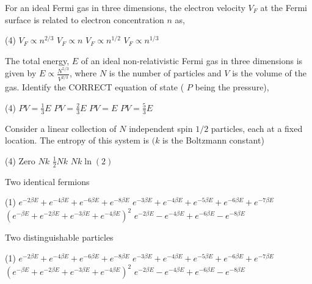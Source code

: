 \begin{enumerate}
\item For an ideal Fermi gas in three dimensions, the electron velocity $V_{F}$ at the Fermi surface is related to electron concentration $n$ as,
{}

\begin{tasks}(4)
	\task[\textbf{A.}] $V_{F} \propto n^{2 / 3}$
	\task[\textbf{B.}]  $V_{F} \propto n$
	\task[\textbf{C.}] $V_{F} \propto n^{1 / 2}$
	\task[\textbf{D.}] $V_{F} \propto n^{1 / 3}$
\end{tasks}

\item The total energy, $E$ of an ideal non-relativistic Fermi gas in three dimensions is given by $E \propto \frac{N^{5 / 3}}{V^{2 / 3}}$, where $N$ is the number of particles and $V$ is the volume of the gas. Identify the CORRECT equation of state ( $P$ being the pressure),
{}
\begin{tasks}(4)
	\task[\textbf{A.}] $P V=\frac{1}{3} E$
	\task[\textbf{B.}] $P V=\frac{2}{3} E$
	\task[\textbf{C.}] $P V=E$
	\task[\textbf{D.}] $P V=\frac{5}{3} E$
\end{tasks}

\item Consider a linear collection of $N$ independent spin $1 / 2$ particles, each at a fixed location. The entropy of this system is $(k$ is the Boltzmann constant)
{}
\begin{tasks}(4)
	\task[\textbf{A.}] Zero
	\task[\textbf{B.}]  $N k$
	\task[\textbf{C.}]  $\frac{1}{2} N k$
	\task[\textbf{D.}] $N k \ln (2)$
\end{tasks}

\item Two identical fermions
{}
\begin{tasks}(1)
	\task[\textbf{A.}] $e^{-2 \beta E}+e^{-4 \beta E}+e^{-6 \beta E}+e^{-8 \beta E}$
	\task[\textbf{B.}] $e^{-3 \beta E}+e^{-4 \beta E}+e^{-5 \beta E}+e^{-6 \beta E}+e^{-7 \beta E}$
	\task[\textbf{C.}] $\left(e^{-\beta E}+e^{-2 \beta E}+e^{-3 \beta E}+e^{-4 \beta E}\right)^{2}$
	\task[\textbf{D.}] $e^{-2 \beta E}-e^{-4 \beta E}+e^{-6 \beta E}-e^{-8 \beta E}$
\end{tasks}

\begin{minipage}{\textwidth}
	\item Two distinguishable particles
	{}
\end{minipage}
\begin{tasks}(1)
	\task[\textbf{A.}] $e^{-2 \beta E}+e^{-4 \beta E}+e^{-6 \beta E}+e^{-8 \beta E}$
	\task[\textbf{B.}] $e^{-3 \beta E}+e^{-4 \beta E}+e^{-5 \beta E}+e^{-6 \beta E}+e^{-7 \beta E}$
	\task[\textbf{C.}] $\left(e^{-\beta E}+e^{-2 \beta E}+e^{-3 \beta E}+e^{-4 \beta E}\right)^{2}$
	\task[\textbf{D.}] $e^{-2 \beta E}-e^{-4 \beta E}+e^{-6 \beta E}-e^{-8 \beta E}$
\end{tasks}


\end{enumerate}

